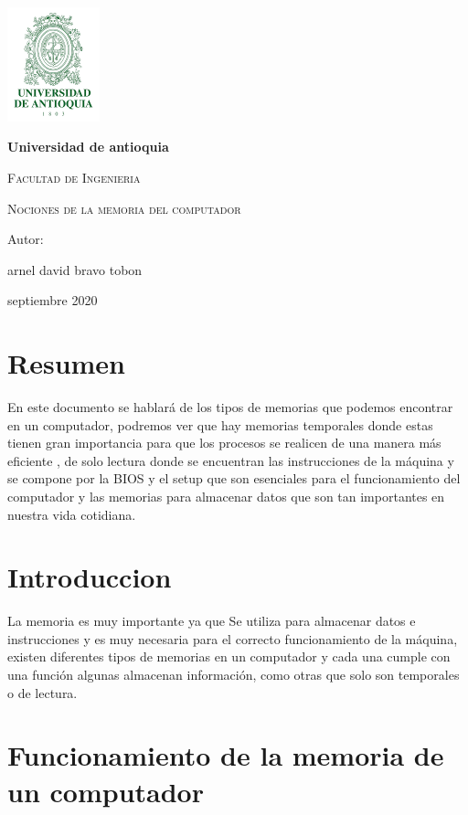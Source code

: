 \documentclass{article}
\begin{document}
\begin{titlepage}
{\includegraphics[width=0.2\textwidth]{udea.png}\par}
\vspace{1cm}
\centering
{\bfseries\LARGE Universidad de antioquia \par}
\vspace{1cm}
{\scshape\Large Facultad de Ingenieria \par}
\vspace{3cm}
{\scshape\Huge Nociones de la memoria del computador \par}
\vspace{3cm}
\vfill
{\Large Autor: \par}
{\Large arnel david bravo tobon  \par}
\vfill
{\Large septiembre 2020 \par}
\end{titlepage}

\section*{Resumen}
En este documento se hablará de los tipos de memorias que podemos encontrar en un computador, podremos ver que hay memorias temporales donde estas tienen gran importancia para que los procesos se realicen de una manera más eficiente , de solo lectura donde se encuentran las instrucciones de la máquina y se compone por la BIOS y el setup que son esenciales para el funcionamiento del computador y las memorias para almacenar datos que son tan importantes en nuestra vida cotidiana. 

\section*{Introduccion}
La memoria es muy importante ya que Se utiliza para almacenar datos e instrucciones y es muy necesaria para el correcto funcionamiento de la máquina, existen diferentes tipos de memorias en un computador y cada una cumple con una función algunas almacenan información, como otras que solo son temporales o de lectura.


\section*{Funcionamiento de la memoria de un computador}
\end{document}
